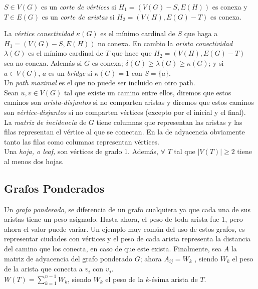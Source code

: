 \documentclass[titlepage,a4paper,12pt,twoside]{article}
\begin{document}
$S \in V(G)$ es un \textit{corte de vértices} si $H_{1} = (V(G) - S,E(H))$ es conexa y $T \in E(G)$ es un \textit{corte de aristas} si $H_{2} = (V(H), E(G) - T)$ es conexa.

La \textit{vértice conectividad} $ \kappa (G)$ es el mínimo cardinal de $S$ que haga a $H_{1} = (V(G) - S,E(H))$ no conexa. En cambio la \textit{arista conectividad} $ \lambda (G)$ es el mínimo cardinal de $T$ que hace que $H_{2} = (V(H), E(G) - T)$ sea no conexa. Además si $G$ es conexa; $\delta (G) \geqslant \lambda (G) \geqslant \kappa (G)$; y si $a \in V(G)$, $a$ es un \textit{bridge} si $ \kappa (G) = 1$ con $S = \{a\}$.\\

Un \textit{path maximal} es el que no puede ser incluido en otro path.\\

Sean $u,v \in V(G)$ tal que existe un camino entre ellos, diremos que estos caminos son \textit{arista-disjuntos} si no comparten aristas y diremos que estos caminos son \textit{vértice-disjuntos} si no comparten vértices (excepto por el inicial y el final).\\

La \textit{matriz de incidencia} de $G$ tiene columnas que representan las aristas y las filas representan el vértice al que se conectan. En la de adyacencia obviamente tanto las filas como columnas representan vértices.\\

Una \textit{hoja, o leaf,} son vértices de grado 1. Además, $\forall $ $T$ tal que $|V(T)| \geqslant 2$ tiene al menos dos hojas.

\subsection{Grafos Ponderados}

Un \textit{grafo ponderado}, se diferencia de un grafo cualquiera ya que cada una de sus aristas tiene un peso asignado. Hasta ahora, el peso de toda arista fue 1, pero ahora el valor puede variar. Un ejemplo muy común del uso de estos grafos, es representar ciudades con vértices y el peso de cada arista representa la distancia del camino que los conecta, en caso de que este exista. Finalmente, sea $A$ la matriz de adyacencia del grafo ponderado $G$; ahora $A_{ij} = W_{k}$ , siendo $W_{k}$ el peso de la arista que conecta a $v_{i}$ con $v_{j}$.\\

$W(T) = \displaystyle \sum_{k=1}^{n-1} W_{k}$, siendo $W_{k}$ el peso de la $k$-ésima arista de $T$.\\
\end{document}
